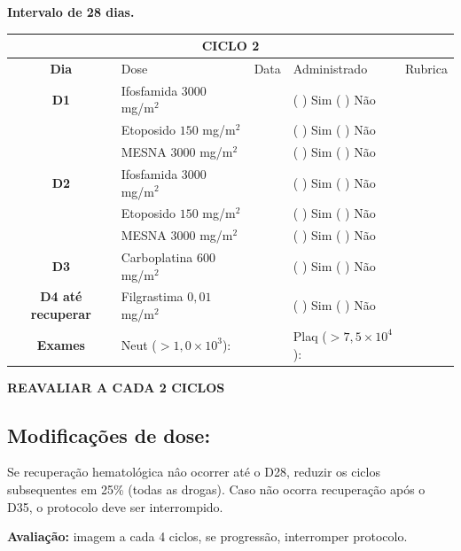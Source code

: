\documentclass[11pt,a4paper,oldfontcommands]{memoir}
\begin{document}
\begin{center}
\textbf{Intervalo de 28 dias.}
\begin{table}[H]
\begin{tabular}{c|p{5cm}|p{1.4cm}|p{3.3cm}|p{1.8cm}}
	\hline
	\multicolumn{5}{c}{\textbf{CICLO 2}}\\
\hline
    \multicolumn{1}{c|}{\multirow{1}{*}{\textbf{Dia}}}&{Dose}&{Data}&{Administrado}&{Rubrica} \\
    \hline
    \multicolumn{1}{c|}{\multirow{1}{*}{\textbf{D1}}}&{Ifosfamida \(3000\) mg/m\(^2\)}&&{(  ) Sim (  ) Não}&\\
    \multicolumn{1}{c|}{\multirow{1}{*}{\textbf{}}}&{Etoposido \(150\) mg/m\(^2\)}&&{(  ) Sim (  ) Não}&\\
    \multicolumn{1}{c|}{\multirow{1}{*}{\textbf{}}}&{MESNA \(3000\) mg/m\(^2\)}&&{(  ) Sim (  ) Não}&\\
    \multicolumn{1}{c|}{\multirow{1}{*}{\textbf{D2}}}&{Ifosfamida \(3000\) mg/m\(^2\)}&&{(  ) Sim (  ) Não}&\\
    \multicolumn{1}{c|}{\multirow{1}{*}{\textbf{}}}&{Etoposido \(150\) mg/m\(^2\)}&&{(  ) Sim (  ) Não}&\\
    \multicolumn{1}{c|}{\multirow{1}{*}{\textbf{}}}&{MESNA \(3000\) mg/m\(^2\)}&&{(  ) Sim (  ) Não}&\\
     \multicolumn{1}{c|}{\multirow{1}{*}{\textbf{D3}}}&{Carboplatina \(600\) mg/m\(^2\)}&&{(  ) Sim (  ) Não}&\\
    \hline
    \multicolumn{1}{c|}{\multirow{1}{*}{\textbf{D4 até recuperar}}}&{Filgrastima \(0,01\) mg/m\(^2\)}&&{(  ) Sim (  ) Não}&\\
    \hline
    \multicolumn{1}{c|}{\multirow{1}{*}{\textbf{Exames}}}&\multicolumn{2}{l|}{Neut (\(>1,0\times10^3\)):}&{Plaq (\(>7,5\times10^4\)):}&{}\\
    \hline
\end{tabular}
\end{table}
\textbf{REAVALIAR A CADA 2 CICLOS}
\end{center}

\subsection{Modificações de dose:}
Se recuperação hematológica nâo ocorrer até o D28, reduzir os ciclos subsequentes em 25\% (todas as drogas). Caso não ocorra recuperação após o D35, o protocolo deve ser interrompido.

\textbf{Avaliação:} imagem a cada 4 ciclos, se progressão, interromper protocolo.
\end{document}
